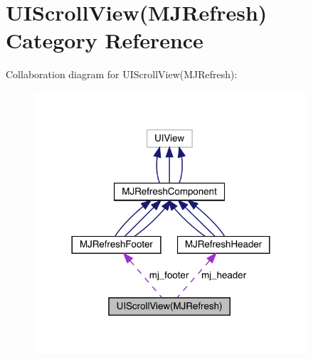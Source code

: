 \hypertarget{category_u_i_scroll_view_07_m_j_refresh_08}{}\section{U\+I\+Scroll\+View(M\+J\+Refresh) Category Reference}
\label{category_u_i_scroll_view_07_m_j_refresh_08}


Collaboration diagram for U\+I\+Scroll\+View(M\+J\+Refresh)\+:\nopagebreak
\begin{figure}[H]
\begin{center}
\leavevmode
\includegraphics[width=288pt]{category_u_i_scroll_view_07_m_j_refresh_08__coll__graph}
\end{center}
\end{figure}
